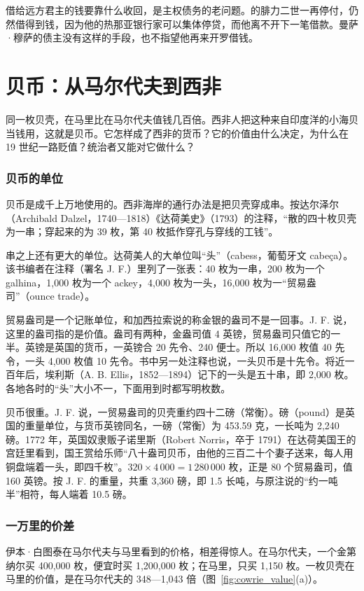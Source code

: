 借给远方君主的钱要靠什么收回，是主权债务的老问题。的腓力二世一再停付，仍然借得到钱，因为他的热那亚银行家可以集体停贷，而他离不开下一笔借款。曼萨·穆萨的债主没有这样的手段，也不指望他再来开罗借钱。

\section{贝币：从马尔代夫到西非}\label{sec:africa-cowrie}

同一枚贝壳，在马里比在马尔代夫值钱几百倍。西非人把这种来自印度洋的小海贝当钱用，这就是贝币。它怎样成了西非的货币？它的价值由什么决定，为什么在 19 世纪一路贬值？统治者又能对它做什么？

\subsubsection{贝币的单位}
贝币是成千上万地使用的。西非海岸的通行办法是把贝壳穿成串。按达尔泽尔（Archibald Dalzel，1740—1818）《达荷美史》（1793）的注释，“散的四十枚贝壳为一串；穿起来的为 39 枚，第 40 枚抵作穿孔与穿线的工钱”\cite{dalzel1793}。

串之上还有更大的单位。达荷美人的大单位叫“头”（cabess，葡萄牙文 cabeça）。该书编者在注释（署名 J. F.）里列了一张表：40 枚为一串，200 枚为一个 galhina，1,000 枚为一个 ackey，4,000 枚为一头，16,000 枚为一“贸易盎司”（ounce trade）\cite{dalzel1793}。

贸易盎司是一个记账单位，和加西拉索说的称金银的盎司不是一回事。J. F. 说，这里的盎司指的是价值。盎司有两种，金盎司值 4 英镑，贸易盎司只值它的一半。英镑是英国的货币，一英镑合 20 先令、240 便士。所以 16,000 枚值 40 先令，一头 4,000 枚值 10 先令。书中另一处注释也说，一头贝币是十先令。将近一百年后，埃利斯（A. B. Ellis，1852—1894）记下的一头是五十串，即 2,000 枚\cite{ellis1890}。各地各时的“头”大小不一，下面用到时都写明枚数。

贝币很重。J. F. 说，一贸易盎司的贝壳重约四十二磅（常衡）。磅（pound）是英国的重量单位，与货币英镑同名，一磅（常衡）为 453.59 克，一长吨为 2,240 磅。1772 年，英国奴隶贩子诺里斯（Robert Norris，卒于 1791）在达荷美国王的宫廷里看到，国王赏给乐师“八十盎司贝币，由他的三百二十个妻子送来，每人用铜盘端着一头，即四千枚”\cite{dalzel1793}。$320\times4\,000=1\,280\,000$ 枚，正是 80 个贸易盎司，值 160 英镑。按 J. F. 的重量，共重 3,360 磅，即 1.5 长吨，与原注说的“约一吨半”相符，每人端着 10.5 磅。

\subsubsection{一万里的价差}
伊本·白图泰在马尔代夫与马里看到的价格，相差得惊人。在马尔代夫，一个金第纳尔买 400,000 枚，便宜时买 1,200,000 枚；在马里，只买 1,150 枚。一枚贝壳在马里的价值，是在马尔代夫的 348—1,043 倍（图~\ref{fig:cowrie_value}(a)）。

